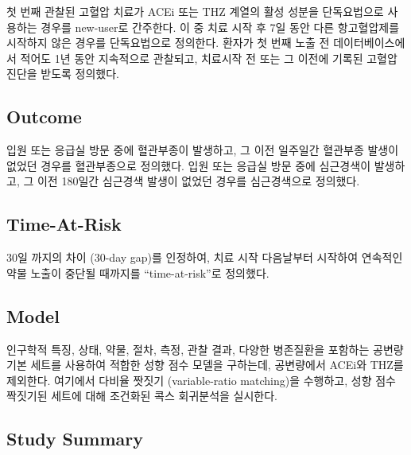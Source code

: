 \documentclass[11pt]{book}
\theoremstyle{definition}
\theoremstyle{definition}
\theoremstyle{definition}
\theoremstyle{remark}
\begin{document}
첫 번째 관찰된 고혈압 치료가 ACEi 또는 THZ 계열의 활성 성분을
단독요법으로 사용하는 경우를 new-user로 간주한다. 이 중 치료 시작 후 7일
동안 다른 항고혈압제를 시작하지 않은 경우를 단독요법으로 정의한다.
환자가 첫 번째 노출 전 데이터베이스에서 적어도 1년 동안 지속적으로
관찰되고, 치료시작 전 또는 그 이전에 기록된 고혈압 진단을 받도록
정의했다.

\subsection{Outcome}\label{outcome-1}

입원 또는 응급실 방문 중에 혈관부종이 발생하고, 그 이전 일주일간
혈관부종 발생이 없었던 경우를 혈관부종으로 정의했다. 입원 또는 응급실
방문 중에 심근경색이 발생하고, 그 이전 180일간 심근경색 발생이 없었던
경우를 심근경색으로 정의했다.

\subsection{Time-At-Risk}\label{time-at-risk-1}

30일 까지의 차이 (30-day gap)를 인정하여, 치료 시작 다음날부터 시작하여
연속적인 약물 노출이 중단될 때까지를 ``time-at-risk''로 정의했다.

\subsection{Model}\label{model}

인구학적 특징, 상태, 약물, 절차, 측정, 관찰 결과, 다양한 병존질환을
포함하는 공변량 기본 세트를 사용하여 적합한 성향 점수 모델을 구하는데,
공변량에서 ACEi와 THZ를 제외한다. 여기에서 다비율 짯짓기 (variable-ratio
matching)을 수행하고, 성향 점수 짝짓기된 세트에 대해 조건화된 콕스
회귀분석을 실시한다.

\subsection{Study Summary}\label{study-summary}
\end{document}
